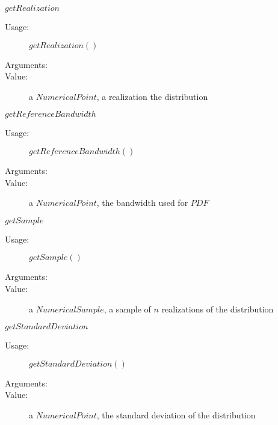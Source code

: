 \begin{description}
\begin{description}
  \item $getRealization$
    \begin{description}
    \item[Usage:]  $getRealization()$
    \item[Arguments:]  \strut
    \item[Value:] a $NumericalPoint$, a realization the distribution
    \end{description}

  \item $getReferenceBandwidth$
    \begin{description}
    \item[Usage:]  $getReferenceBandwidth()$
    \item[Arguments:]  \strut
    \item[Value:] a $NumericalPoint$, the bandwidth used for $PDF$
    \end{description}

  \item $getSample$
    \begin{description}
    \item[Usage:]  $getSample()$
    \item[Arguments:]  \strut
    \item[Value:] a $NumericalSample$, a sample of $n$ realizations of the distribution
    \end{description}

  \item $getStandardDeviation$
    \begin{description}
    \item[Usage:]  $getStandardDeviation()$
    \item[Arguments:]  \strut
    \item[Value:] a $NumericalPoint$, the standard deviation of the distribution
    \end{description}


\end{description}
\end{description}
